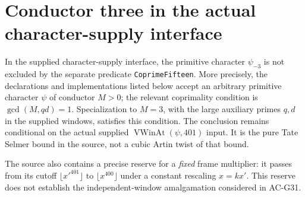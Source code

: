 \section{Conductor three in the actual character-supply interface}
\label{sec:conductor-three-audit}

\begin{proposition}
\label{AC-G34}
In the supplied character-supply interface, the primitive character
$\psi_{-3}$ is not excluded by the separate predicate
\texttt{CoprimeFifteen}.  More precisely, the declarations and
implementations listed below accept an arbitrary primitive character
$\psi$ of conductor $M>0$; the relevant coprimality condition is
$\gcd(M,qd)=1$.  Specialization to $M=3$, with the large auxiliary
primes $q,d$ in the supplied windows, satisfies this condition.
The conclusion remains conditional on the actual supplied
$\operatorname{VWinAt}(\psi,401)$ input.  It is the pure Tate
Selmer bound in the source, not a cubic Artin twist of that bound.

The source also contains a precise reserve for a \emph{fixed}
frame multiplier: it passes from its cutoff $\lfloor x'^{401}\rfloor$
to $\lfloor x^{400}\rfloor$ under a constant rescaling
$x=kx'$.  This reserve does not establish the independent-window
amalgamation considered in AC-G31.
\end{proposition}
